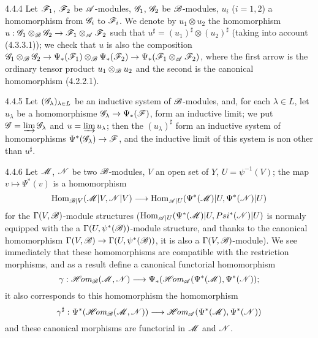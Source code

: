 \begin{env}{4.4.4}
\label{env-0.4.4.4}
Let $\mathscr{F}_1$, $\mathscr{F}_2$ be $\mathscr{A}$-modules, $\mathscr{G}_1$, $\mathscr{G}_2$ be $\mathscr{B}$-modules,
$u_i$ ($i=1,2$) a homomorphism from $\mathscr{G}_i$ to $\mathscr{F}_i$. We denote by $u_1\otimes u_2$
the homomorphism $u:\mathscr{G}_1\otimes_\mathscr{B}\mathscr{G}_2\to\mathscr{F}_1\otimes_\mathscr{A}\mathscr{F}_2$ such
that $u^\sharp=(u_1)^\sharp\otimes(u_2)^\sharp$ (taking into account (4.3.3.1)); we check
that $u$ is also the composition
$\mathscr{G}_1\otimes_\mathscr{B}\mathscr{G}_2\to\Psi_*(\mathscr{F}_1)\otimes_\mathscr{B}\Psi_*(\mathscr{F}_2)
\to\Psi_*(\mathscr{F}_1\otimes_\mathscr{A}\mathscr{F}_2)$, where the first arrow is the ordinary tensor
product $u_1\otimes_\mathscr{B}u_2$ and the second is the canonical homomorphism (4.2.2.1).
\end{env}

\begin{env}{4.4.5}
\label{env-0.4.4.5}
Let $(\mathscr{G}_\lambda)_{\lambda\in L}$ be an inductive system of $\mathscr{B}$-modules, and, for
each $\lambda\in L$, let $u_\lambda$ be a homomorphisme $\mathscr{G}_\lambda\to\Psi_*(\mathscr{F})$,
form an inductive limit; we put $\mathscr{G}=\varinjlim\mathscr{G}_\lambda$ and
$u=\varinjlim u_\lambda$; then the $(u_\lambda)^\sharp$ form an inductive system of
homomorphisms $\Psi^*(\mathscr{G}_\lambda)\to\mathscr{F}$, and the inductive limit of this system is
non other than $u^\sharp$.
\end{env}

\begin{env}{4.4.6}
\label{env-0.4.6.6}
Let $\mathscr{M}$, $\mathscr{N}$ be two $\mathscr{B}$-modules, $V$ an open set of $Y$, $U=\psi^{-1}(V)$; the
map $v\mapsto\Psi^*(v)$ is a homomorphism
\[
  {\mathop{\mathrm{Hom}}\nolimits}_{\mathscr{B}|V}(\mathscr{M}|V,\mathscr{N}|V)
  \longrightarrow{\mathop{\mathrm{Hom}}\nolimits}_{\mathscr{A}|U}(\Psi^*(\mathscr{M})|U,\Psi^*(\mathscr{N})|U)
\]
for the $\Gamma(V,\mathscr{B})$-module structures
(${\mathop{\mathrm{Hom}}\nolimits}_{\mathscr{A}|U}(\Psi^*(\mathscr{M})|U,Psi^*(\mathscr{N})|U)$ is normaly equipped with the a
$\Gamma(U,\psi^*(\mathscr{B}))$-module structure, and thanks to the canonical homomorphism
 $\Gamma(V,\mathscr{B})\to\Gamma(U,\psi^*(\mathscr{B}))$, it is also a
$\Gamma(V,\mathscr{B})$-module). We see immediately that these homomorphisms are compatible with
the restriction morphisms, and as a result define a canonical functorial homomorphism
\[
  \gamma:\mathscr{H}\!\textit{om}_\mathscr{B}(\mathscr{M},\mathscr{N})
  \longrightarrow\Psi_*(\mathscr{H}\!\textit{om}_\mathscr{A}(\Psi^*(\mathscr{M}),\Psi^*(\mathscr{N}));
\]
it also corresponds to this homomorphism the homomorphism
\[
  \gamma^\sharp:\Psi^*(\mathscr{H}\!\textit{om}_\mathscr{B}(\mathscr{M},\mathscr{N}))
  \longrightarrow\mathscr{H}\!\textit{om}_\mathscr{A}(\Psi^*(\mathscr{M}),\Psi^*(\mathscr{N}))
\]
and these canonical morphisms are functorial in $\mathscr{M}$ and $\mathscr{N}$.
\end{env}

